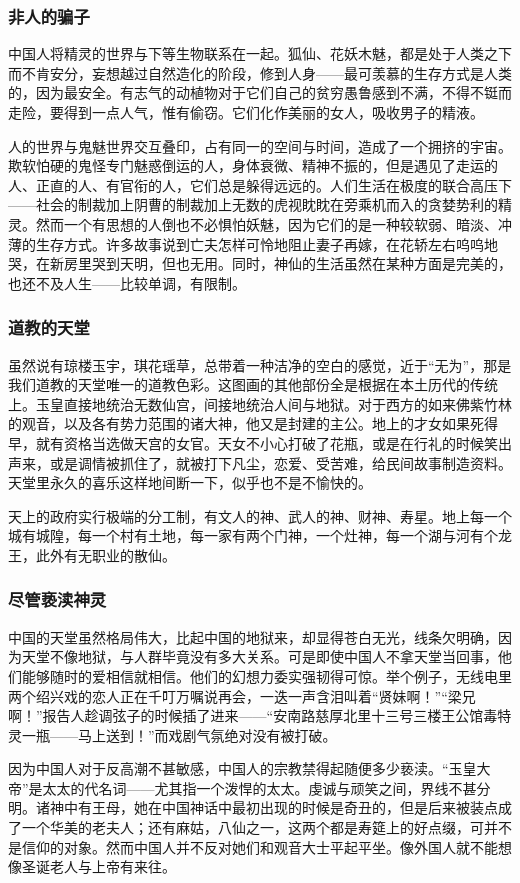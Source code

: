 \subsubsection*{非人的骗子}
\par 中国人将精灵的世界与下等生物联系在一起。狐仙、花妖木魅，都是处于人类之下而不肯安分，妄想越过自然造化的阶段，修到人身——最可羡慕的生存方式是人类的，因为最安全。有志气的动植物对于它们自己的贫穷愚鲁感到不满，不得不铤而走险，要得到一点人气，惟有偷窃。它们化作美丽的女人，吸收男子的精液。
\par 人的世界与鬼魅世界交互叠印，占有同一的空间与时间，造成了一个拥挤的宇宙。欺软怕硬的鬼怪专门魅惑倒运的人，身体衰微、精神不振的，但是遇见了走运的人、正直的人、有官衔的人，它们总是躲得远远的。人们生活在极度的联合高压下——社会的制裁加上阴曹的制裁加上无数的虎视眈眈在旁乘机而入的贪婪势利的精灵。然而一个有思想的人倒也不必惧怕妖魅，因为它们的是一种较软弱、暗淡、冲薄的生存方式。许多故事说到亡夫怎样可怜地阻止妻子再嫁，在花轿左右呜呜地哭，在新房里哭到天明，但也无用。同时，神仙的生活虽然在某种方面是完美的，也还不及人生——比较单调，有限制。
\subsubsection*{道教的天堂}
\par 虽然说有琼楼玉宇，琪花瑶草，总带着一种洁净的空白的感觉，近于“无为”，那是我们道教的天堂唯一的道教色彩。这图画的其他部份全是根据在本土历代的传统上。玉皇直接地统治无数仙宫，间接地统治人间与地狱。对于西方的如来佛紫竹林的观音，以及各有势力范围的诸大神，他又是封建的主公。地上的才女如果死得早，就有资格当选做天宫的女官。天女不小心打破了花瓶，或是在行礼的时候笑出声来，或是调情被抓住了，就被打下凡尘，恋爱、受苦难，给民间故事制造资料。天堂里永久的喜乐这样地间断一下，似乎也不是不愉快的。
\par 天上的政府实行极端的分工制，有文人的神、武人的神、财神、寿星。地上每一个城有城隍，每一个村有土地，每一家有两个门神，一个灶神，每一个湖与河有个龙王，此外有无职业的散仙。
\subsubsection*{尽管亵渎神灵}
\par 中国的天堂虽然格局伟大，比起中国的地狱来，却显得苍白无光，线条欠明确，因为天堂不像地狱，与人群毕竟没有多大关系。可是即使中国人不拿天堂当回事，他们能够随时的爱相信就相信。他们的幻想力委实强韧得可惊。举个例子，无线电里两个绍兴戏的恋人正在千叮万嘱说再会，一迭一声含泪叫着“贤妹啊！”“梁兄啊！”报告人趁调弦子的时候插了进来——“安南路慈厚北里十三号三楼王公馆毒特灵一瓶——马上送到！”而戏剧气氛绝对没有被打破。
\par 因为中国人对于反高潮不甚敏感，中国人的宗教禁得起随便多少亵渎。“玉皇大帝”是太太的代名词——尤其指一个泼悍的太太。虔诚与顽笑之间，界线不甚分明。诸神中有王母，她在中国神话中最初出现的时候是奇丑的，但是后来被装点成了一个华美的老夫人；还有麻姑，八仙之一，这两个都是寿筵上的好点缀，可并不是信仰的对象。然而中国人并不反对她们和观音大士平起平坐。像外国人就不能想像圣诞老人与上帝有来往。
